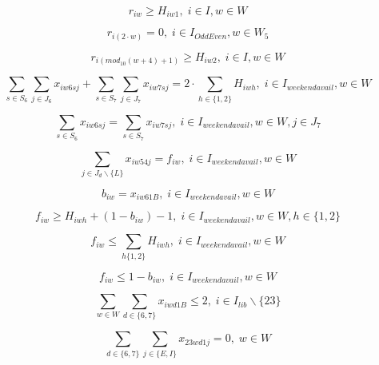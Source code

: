 \begin{equation}
r_{iw} \geq H_{iw1}, \; i \in I, w \in W
\end{equation}

\begin{equation}
r_{i(2\cdot w)} = 0, \; i \in I_{OddEven}, w \in W_5
\end{equation}

\begin{equation}
r_{i(mod_{10}(w+4)+1)} \geq H_{iw2}, \; i \in I, w \in W
\end{equation}

\begin{equation}
\sum_{s \in S_6} \sum_{j \in J_6} x_{iw6sj} + \sum_{s \in S_7} \sum_{j \in J_7} x_{iw7sj} = 2\cdot \sum_{h \in \{1,2\}} H_{iwh}, \; i \in I_{weekendavail}, w \in W
\end{equation}

\begin{equation}
\sum_{s \in S_6} x_{iw6sj} = \sum_{s \in S_7} x_{iw7sj}, \; i \in I_{weekendavail}, w \in W, j \in J_7
\end{equation}

\begin{equation}
\sum_{j \in J_d \backslash \{L\}} x_{iw54j} = f_{iw}, \; i \in I_{weekendavail}, w \in W
\end{equation}

\begin{equation}
b_{iw} = x_{iw61B}, \; i \in I_{weekendavail}, w \in W
\end{equation}

\begin{equation}
f_{iw} \geq H_{iwh} + (1 - b_{iw}) - 1, \; i \in I_{weekendavail}, w \in W, h \in \{1,2\}
\end{equation}

\begin{equation}
f_{iw} \leq \sum_{h \{1,2\}} H_{iwh}, \; i \in I_{weekendavail}, w \in W
\end{equation}

\begin{equation}
f_{iw} \leq 1 - b_{iw}, \; i \in I_{weekendavail}, w \in W
\end{equation}

\begin{equation}
\sum_{w \in W} \sum_{d \in \{6,7\}} x_{iwd1B} \leq 2, \; i \in I_{lib} \backslash \{23\}
\end{equation}

\begin{equation}
\sum_{d \in \{6,7\}} \sum_{j \in \{E,I\}} x_{23wd1j} = 0, \; w \in W
\end{equation}

